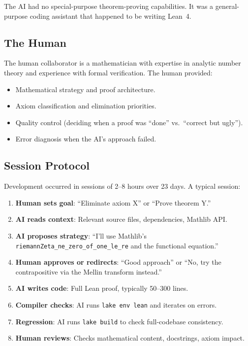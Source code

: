 \documentclass[11pt,a4paper]{article}
\newcommand{\lean}[1]{\texttt{#1}}
\begin{document}
The AI had no special-purpose theorem-proving capabilities. It was
a general-purpose coding assistant that happened to be writing Lean~4.

\subsection{The Human}

The human collaborator is a mathematician with expertise in analytic
number theory and experience with formal verification. The human
provided:

\begin{itemize}
  \item Mathematical strategy and proof architecture.
  \item Axiom classification and elimination priorities.
  \item Quality control (deciding when a proof was ``done'' vs.\
    ``correct but ugly'').
  \item Error diagnosis when the AI's approach failed.
\end{itemize}

\subsection{Session Protocol}

Development occurred in sessions of 2--8 hours over 23 days. A
typical session:

\begin{enumerate}
  \item \textbf{Human sets goal}: ``Eliminate axiom X'' or ``Prove
    theorem Y.''
  \item \textbf{AI reads context}: Relevant source files, dependencies,
    Mathlib API.
  \item \textbf{AI proposes strategy}: ``I'll use Mathlib's
    \lean{riemannZeta\_ne\_zero\_of\_one\_le\_re} and the functional
    equation.''
  \item \textbf{Human approves or redirects}: ``Good approach'' or
    ``No, try the contrapositive via the Mellin transform instead.''
  \item \textbf{AI writes code}: Full Lean proof, typically 50--300
    lines.
  \item \textbf{Compiler checks}: AI runs \lean{lake env lean} and
    iterates on errors.
  \item \textbf{Regression}: AI runs \lean{lake build} to check
    full-codebase consistency.
  \item \textbf{Human reviews}: Checks mathematical content,
    docstrings, axiom impact.
\end{enumerate}
\end{document}

